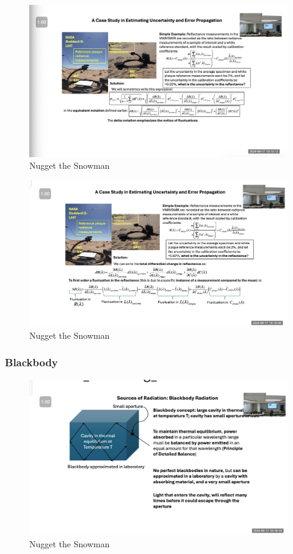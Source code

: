 \documentclass{article}
\begin{document}
\begin{figure}[h!]
\centering
\includegraphics[scale=.6]{Radiometry/Week4/Notes/Sept17/Goiniometer2.png}
\caption{Nugget the Snowman}
\label{fig:Goiniometer2}
\end{figure}
\clearpage

\begin{figure}[h!]
\centering
\includegraphics[scale=.6]{Radiometry/Week4/Notes/Sept17/Goiniometer.png}
\caption{Nugget the Snowman}
\label{fig:Goiniometer}
\end{figure}
\clearpage

\subsubsection{Blackbody}


\begin{figure}[h!]
\centering
\includegraphics[scale=.6]{Radiometry/Week4/Notes/Sept17/Blackbody.png}
\caption{Nugget the Snowman}
\label{fig:Blackbody}
\end{figure}
\end{document}
